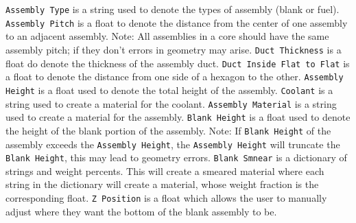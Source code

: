 \documentclass{article}
\begin{document}
\verb|Assembly Type| is a string used to denote the types of assembly (blank or fuel). \verb|Assembly Pitch| is a float to denote the distance from the center of one assembly to an adjacent assembly. Note: All assemblies in a core should have the same assembly pitch; if they don't errors in geometry may arise. \verb|Duct Thickness| is a float do denote the thickness of the assembly duct. \verb|Duct Inside Flat to Flat| is a float to denote the distance from one side of a hexagon to the other. \verb|Assembly Height| is a float used to denote the total height of the assembly. \verb|Coolant| is a string used to create a material for the coolant. \verb|Assembly Material| is a string used to create a material for the assembly. \verb|Blank Height| is a float used to denote the height of the blank portion of the assembly. Note: If \verb|Blank Height| of the assembly exceeds the \verb|Assembly Height|, the \verb|Assembly Height| will truncate the \verb|Blank Height|, this may lead to geometry errors. \verb|Blank Smnear| is a dictionary of strings and weight percents. This will create a smeared material where each string in the dictionary will create a material, whose weight fraction is the corresponding float. \verb|Z Position| is a float which allows the user to manually adjust where they want the bottom of the blank assembly to be.
\end{document}
